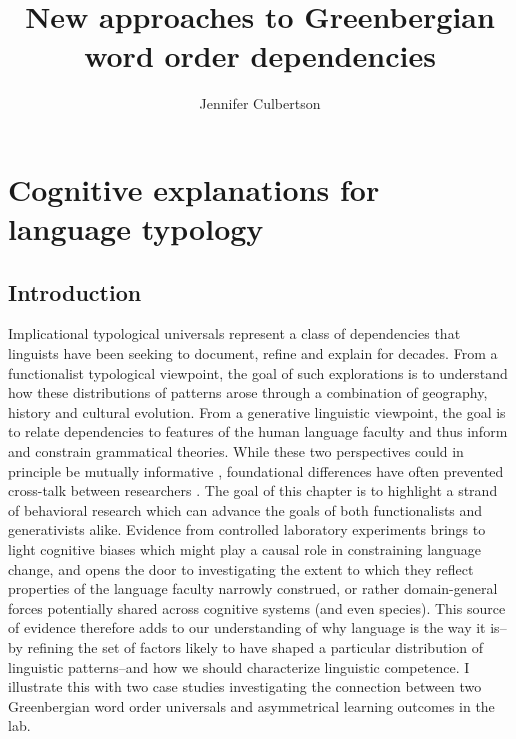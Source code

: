 \documentclass[output=paper]{langsci/langscibook}
\title{New approaches to Greenbergian word order dependencies}
\author{Jennifer Culbertson\affiliation{School of Philosophy, Psychology and Language Sciences, University of Edinburgh, Edinburgh, UK}}
\begin{document}
\section{Cognitive explanations for language typology}
\subsection{Introduction}
     
Implicational typological universals \citep[e.g.,][]{Greenberg63} represent a class of dependencies that linguists have been seeking to document, refine and explain for decades. From a functionalist typological viewpoint, the goal of such explorations is to understand how these distributions of patterns arose through a combination of geography, history and cultural evolution. From a generative linguistic viewpoint, the goal is to relate dependencies to features of the human language faculty and thus inform and constrain grammatical theories. While these two perspectives could in principle be mutually informative \citep{Hawkins04, BakerMcCloskey07}, foundational differences have often prevented cross-talk between researchers \citep{bickel2007typology, haspelmath2000why, newmeyer2010irrelevance}. The goal of this chapter is to highlight a strand of behavioral research which %
can advance the goals of both functionalists and generativists alike. Evidence from controlled laboratory experiments brings to light cognitive biases which might play a causal role in constraining language change, and opens the door to investigating the extent to which they reflect properties of the language faculty narrowly construed, or rather domain-general forces potentially shared across cognitive systems (and even species). This source of evidence therefore adds to our understanding of why language is the way it is--by refining the set of factors likely to have shaped a particular distribution of linguistic patterns--and how we should characterize linguistic competence. I illustrate this with two case studies investigating the connection between two Greenbergian word order universals and asymmetrical learning outcomes in the lab. 
\end{document}
